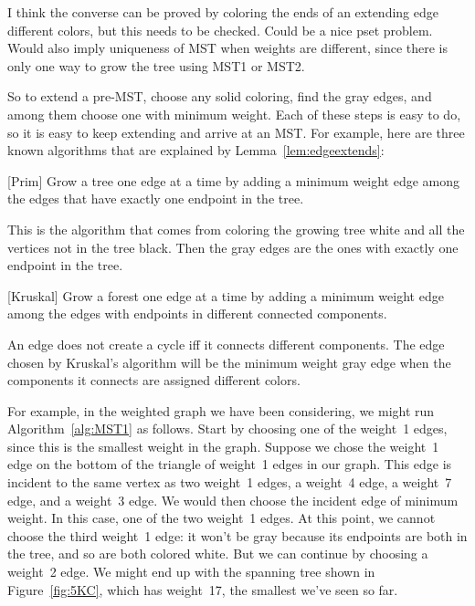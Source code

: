 \begin{editingnotes}
I think the converse can be proved by coloring the ends of an
extending edge different colors, but this needs to be checked.  Could
be a nice pset problem.  Would also imply uniqueness of MST when
weights are different, since there is only one way to grow the tree
using MST1 or MST2.
\end{editingnotes}

So to extend a pre-MST, choose any solid coloring, find the gray
edges, and among them choose one with minimum weight.  Each of these
steps is easy to do, so it is easy to keep extending and arrive at an
MST.  For example, here are three known algorithms that are explained
by Lemma~\ref{lem:edgeextends}:

\begin{algorithm}\label{alg:MST1}[Prim]
  Grow a tree one edge at a time by adding a minimum weight edge
  among the edges that have exactly one endpoint in the tree.
\end{algorithm}

This is the algorithm that comes from coloring the growing tree white
and all the vertices not in the tree black.  Then the gray edges are
the ones with exactly one endpoint in the tree.

\begin{algorithm}\label{alg:MST2}[Kruskal]
  Grow a forest one edge at a time by adding a minimum weight edge
  among the edges with endpoints in different connected components.
\end{algorithm}

An edge does not create a cycle iff it connects different components.
The edge chosen by Kruskal's algorithm will be the minimum weight gray
edge when the components it connects are assigned different colors.

\iffalse  %
The edges between different components are exactly the edges that are
gray under some solid coloring, namely any coloring where the
components it connects have different colors.
\fi

For example, in the weighted graph we have been considering, we might
run Algorithm~\ref{alg:MST1} as follows.  Start by choosing one of the
weight~1 edges, since this is the smallest weight in the graph.
Suppose we chose the weight~1 edge on the bottom of the triangle of
weight~1 edges in our graph.  This edge is incident to the same vertex
as two weight~1 edges, a weight~4 edge, a weight~7 edge, and a
weight~3 edge.  We would then choose the incident edge of minimum
weight.  In this case, one of the two weight~1 edges.  At this point,
we cannot choose the third weight~1 edge: it won't be gray because its
endpoints are both in the tree, and so are both colored white.  But we
can continue by choosing a weight~2 edge.  We might end up with the
spanning tree shown in Figure~\ref{fig:5KC}, which has weight~17, the
smallest we've seen so far.

